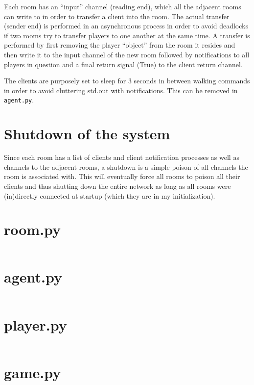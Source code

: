 \documentclass[11pt,a4paper]{article}
\begin{document}
Each room has an ``input'' channel (reading end), which all the adjacent
rooms can write to in order to transfer a client into the room. The actual
transfer (sender end) is performed in an asynchronous process in order to
avoid deadlocks if two rooms try to transfer players to one another at the
same time. A transfer is performed by first removing the player ``object''
from the room it resides and then write it to the input channel of the new
room followed by notifications to all players in question and a final return
signal (True) to the client return channel.

The clients are purposely set to sleep for 3 seconds in between walking commands
in order to avoid cluttering std.out with notifications. This can be removed in
\texttt{agent.py}.

\section{Shutdown of the system}
Since each room has a list of clients and client notification processes as
well as channels to the adjacent rooms, a shutdown is a simple poison of all
channels the room is associated with. This will eventually
force all rooms to poison all their clients and thus shutting down the entire
network as long as all rooms were (in)directly connected at startup (which they
are in my initialization).


\clearpage
\appendix

\section{room.py}
\inputminted[linenos,fontsize=\scriptsize]{python}{src/room.py}

\section{agent.py}
\inputminted[linenos,fontsize=\scriptsize]{python}{src/agent.py}

\section{player.py}
\inputminted[linenos,fontsize=\scriptsize]{python}{src/player.py}

\section{game.py}
\inputminted[linenos,fontsize=\scriptsize]{python}{src/game.py}
\end{document}
